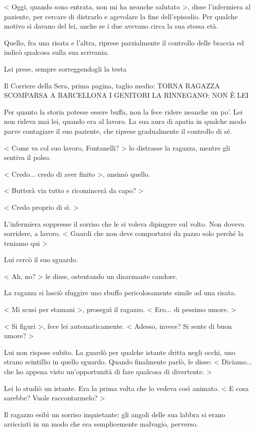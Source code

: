 < Oggi, quando sono entrata, non mi ha neanche salutato >, disse l'infermiera al paziente, per cercare di distrarlo e agevolare la fine dell'episodio. Per qualche motivo si davano del lei, anche se i due avevano circa la sua stessa età.

Quello, fra una risata e l'altra, riprese parzialmente il controllo delle braccia ed indicò qualcosa sulla sua scrivania.

Lei prese, sempre sorreggendogli la testa

Il Corriere della Sera, prima pagina, taglio medio:
TORNA RAGAZZA SCOMPARSA A BARCELLONA
I GENITORI LA RINNEGANO: NON È LEI

Per quanto la storia potesse essere buffa, non la fece ridere neanche un po'. Lei non rideva mai lei, quando era al lavoro. La sua aura di apatia in qualche modo parve contagiare il suo paziente, che riprese gradualmente il controllo di sé.

< Come va col suo lavoro, Fontanelli? > lo distrasse la ragazza, mentre gli sentiva il polso.

< Credo... credo di aver finito >, ansimò quello.

< Butterà via tutto e ricomincerà da capo? >

< Credo proprio di sì. >

L'infermiera soppresse il sorriso che le si voleva dipingere sul volto. Non doveva sorridere, a lavoro. < Guardi che non deve comportarsi da pazzo solo perché la teniamo qui >

Lui cercò il suo sguardo.

< Ah, no? > le disse, ostentando un disarmante candore.

La ragazza si lasciò sfuggire uno sbuffo pericolosamente simile ad una risata.

< Mi scusi per stamani >, proseguì il ragazzo. < Ero... di pessimo umore. >

< Si figuri >, fece lei automaticamente. < Adesso, invece? Si sente di buon umore? >

Lui non rispose subito. La guardò per qualche istante dritta negli occhi, uno strano scintillio in quello sguardo. Quando finalmente parlò, le disse: < Diciamo... che ho appena visto un'opportunità di fare qualcosa di divertente. >

Lei lo studiò un istante. Era la prima volta che lo vedeva così animato. < E cosa sarebbe? Vuole raccontarmelo? >

Il ragazzo esibì un sorriso inquietante: gli angoli delle sua labbra si erano arricciati in un modo che era semplicemente malvagio, perverso.

